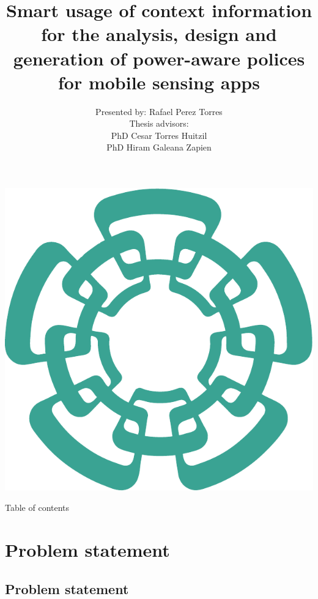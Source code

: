 \documentclass[compress,9pt,xcolor={dvipsnames,table}]{beamer}
\title[Smart usage of context information for the analysis, design and generation of power-aware polices for mobile sensing apps]{ Smart usage of context information for the analysis, design and generation of power-aware polices for mobile sensing apps}
\author[Rafael Perez Torres]{Presented by: Rafael Perez Torres\\[0.5cm] Thesis advisors:\\PhD Cesar Torres Huitzil\\PhD Hiram Galeana Zapien}
\institute{LTI Cinvestav Tamaulipas}
\date{}
\begin{document}
\begin{frame}[plain]
  \begin{center}
  \includegraphics[scale=0.12]{../../../resources/images/vectors/cinvestav-logo-no-text}
  \end{center}
  \titlepage
  
\end{frame}


\begin{frame}{Table of contents}
	\tableofcontents[hideallsubsections]
\end{frame}

\section{Problem statement}
\subsection{Problem statement}
\end{document}
